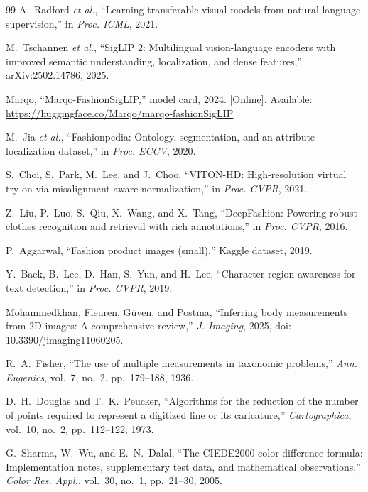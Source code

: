 \documentclass[conference]{IEEEtran}
\begin{document}
\begin{thebibliography}{99}
A.~Radford \emph{et al.}, ``Learning transferable visual models from natural language supervision,'' in \emph{Proc. ICML}, 2021.

M.~Tschannen \emph{et al.}, ``SigLIP 2: Multilingual vision-language encoders with improved semantic understanding, localization, and dense features,'' arXiv:2502.14786, 2025.

Marqo, ``Marqo-FashionSigLIP,'' model card, 2024. [Online]. Available: \url{https://huggingface.co/Marqo/marqo-fashionSigLIP}

M.~Jia \emph{et al.}, ``Fashionpedia: Ontology, segmentation, and an attribute localization dataset,'' in \emph{Proc. ECCV}, 2020.

S.~Choi, S.~Park, M.~Lee, and J.~Choo, ``VITON-HD: High-resolution virtual try-on via misalignment-aware normalization,'' in \emph{Proc. CVPR}, 2021.

Z.~Liu, P.~Luo, S.~Qiu, X.~Wang, and X.~Tang, ``DeepFashion: Powering robust clothes recognition and retrieval with rich annotations,'' in \emph{Proc. CVPR}, 2016.

P.~Aggarwal, ``Fashion product images (small),'' Kaggle dataset, 2019.

Y.~Baek, B.~Lee, D.~Han, S.~Yun, and H.~Lee, ``Character region awareness for text detection,'' in \emph{Proc. CVPR}, 2019.

Mohammedkhan, Fleuren, G\"{u}ven, and Postma, ``Inferring body measurements from 2D images: A comprehensive review,'' \emph{J. Imaging}, 2025, doi: 10.3390/jimaging11060205.

R.~A.~Fisher, ``The use of multiple measurements in taxonomic problems,'' \emph{Ann. Eugenics}, vol.~7, no.~2, pp.~179--188, 1936.

D.~H.~Douglas and T.~K.~Peucker, ``Algorithms for the reduction of the number of points required to represent a digitized line or its caricature,'' \emph{Cartographica}, vol.~10, no.~2, pp.~112--122, 1973.

G.~Sharma, W.~Wu, and E.~N.~Dalal, ``The CIEDE2000 color-difference formula: Implementation notes, supplementary test data, and mathematical observations,'' \emph{Color Res. Appl.}, vol.~30, no.~1, pp.~21--30, 2005.


\end{thebibliography}
\end{document}
